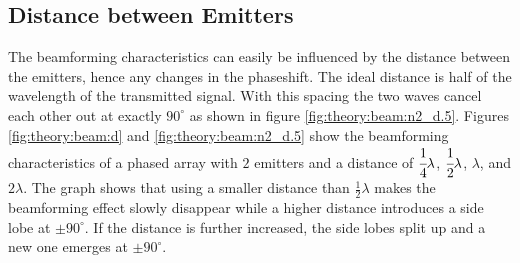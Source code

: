 \subsection{Distance between Emitters}

The beamforming characteristics can easily be influenced by the distance between the emitters, hence any changes in the phaseshift.
The ideal distance is half of the wavelength of the transmitted signal. With this spacing the two waves cancel each other out at exactly $90^\circ$ as shown in figure \ref{fig:theory:beam:n2_d.5}.\p
%
Figures \ref{fig:theory:beam:d} and \ref{fig:theory:beam:n2_d.5} show the beamforming characteristics of a phased array with $2$ emitters and a distance of $\cfrac{1}{4}\lambda$, $\cfrac{1}{2}\lambda$, $\lambda$, and $2\lambda$. The graph shows that using a smaller distance than $\frac{1}{2} \lambda$ makes the beamforming effect slowly disappear while a higher distance introduces a side lobe at $\pm 90^\circ$. If the distance is further increased, the side lobes split up and a new one emerges at $\pm 90^\circ$.
%
